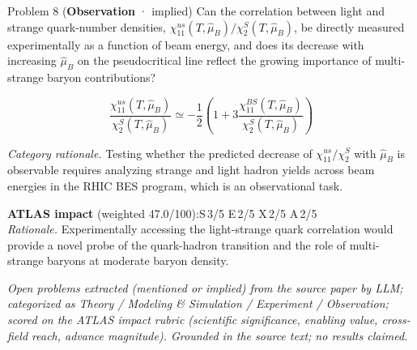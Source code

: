 \documentclass[11pt,letterpaper]{article}
\begin{document}
\begin{opbox}{Problem 8 \textnormal{\small(\textcolor{catObs}{\textbf{Observation}} · implied)}}
Can the correlation between light and strange quark-number densities, $\chi_{11}^{us}(T,\hat{\mu}_B)/\chi_2^S(T,\hat{\mu}_B)$, be directly measured experimentally as a function of beam energy, and does its decrease with increasing $\hat{\mu}_B$ on the pseudocritical line reflect the growing importance of multi-strange baryon contributions?
\vspace{2pt}\begin{mathcap}\[\frac{\chi_{11}^{us}(T,\hat{\mu}_B)}{\chi_2^S(T,\hat{\mu}_B)} \simeq -\frac{1}{2}\left(1 + 3\frac{\chi_{11}^{BS}(T,\hat{\mu}_B)}{\chi_2^S(T,\hat{\mu}_B)}\right)\]\end{mathcap}
\vspace{3pt}
{\small\textit{Category rationale.} Testing whether the predicted decrease of $\chi_{11}^{us}/\chi_2^S$ with $\hat{\mu}_B$ is observable requires analyzing strange and light hadron yields across beam energies in the RHIC BES program, which is an observational task.}
\vspace{3pt}

{\footnotesize\textbf{ATLAS impact} (weighted 47.0/100):\quad S\,3/5 \quad E\,2/5 \quad X\,2/5 \quad A\,2/5\\
\textit{Rationale.} Experimentally accessing the light-strange quark correlation would provide a novel probe of the quark-hadron transition and the role of multi-strange baryons at moderate baryon density.}
\end{opbox}

\vfill
{\footnotesize\color{ink}\textit{Open problems extracted (mentioned or implied) from the source paper by LLM; categorized as Theory / Modeling \& Simulation / Experiment / Observation; scored on the ATLAS impact rubric (scientific significance, enabling value, cross-field reach, advance magnitude). Grounded in the source text; no results claimed.}}
\end{document}
